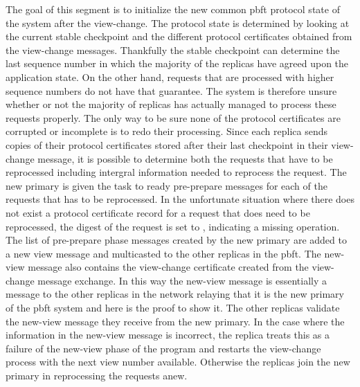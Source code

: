 The goal of this segment is to initialize the new common \ac{pbft} protocol state of the system after the view-change. The protocol state is determined by looking at the current stable checkpoint and the different protocol certificates obtained from the view-change messages. Thankfully the stable checkpoint can determine the last sequence number in which the majority of the replicas have agreed upon the application state. On the other hand, requests that are processed with higher sequence numbers do not have that guarantee. The system is therefore unsure whether or not the majority of replicas has actually managed to process these requests properly. The only way to be sure none of the protocol certificates are corrupted or incomplete is to redo their processing. Since each replica sends copies of their protocol certificates stored after their last checkpoint in their view-change message,  it is possible to determine both the requests that have to be reprocessed including intergral information needed to reprocess the request. The new primary is given the task to ready pre-prepare messages for each of the requests that has to be reprocessed. In the unfortunate situation where there does not exist a protocol certificate record for a request that does need to be reprocessed, the digest of the request is set to , indicating a missing operation. The list of pre-prepare phase messages created by the new primary are added to a new view message and multicasted to the other replicas in the \ac{pbft}. The new-view message also contains the view-change certificate created from the view-change message exchange. In this way the new-view message is essentially a message to the other replicas in the network relaying that it is the new primary of the \ac{pbft} system and here is the proof to show it. The other replicas validate the new-view message they receive from the new primary. In the case where the information in the new-view message is incorrect, the replica treats this as a failure of the new-view phase of the program and restarts the view-change process with the next view number available. Otherwise the replicas join the new primary in reprocessing the requests anew. 

